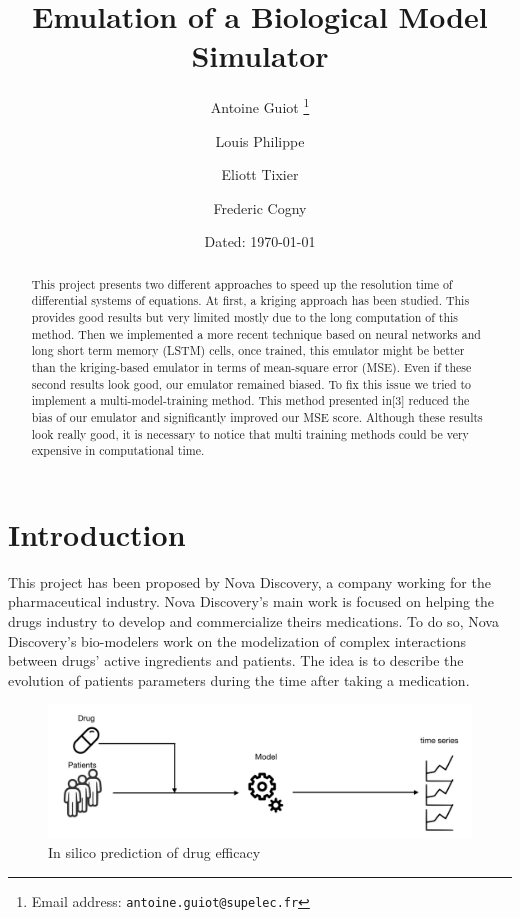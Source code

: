 \documentclass{article}
\title{Emulation of a Biological Model Simulator}
\date{Dated: \today}
\author[,1]{Antoine Guiot \thanks{Email address: \texttt{antoine.guiot@supelec.fr}}}
\author[2]{Louis Philippe }
\author[3]{Eliott Tixier}
\author[,4]{Frederic Cogny}
\affil[1]{CentraleSupélec}
\affil[2]{Nova Discovery}
\affil[3]{Nova Discovery}
\affil[4]{Nova Discovery}
\begin{document}
\maketitle

\begin{abstract}
    This project presents two different approaches to speed up the resolution time of differential systems of equations. At first, a kriging approach has been studied. This provides good results but very limited mostly due to the long computation of this method. Then we implemented a more recent technique based on neural networks and long short term memory (LSTM) cells, once trained, this emulator might be better than the kriging-based emulator in terms of mean-square error (MSE). Even if these second results look good, our emulator remained biased. To fix this issue we tried to implement a multi-model-training method. This method presented in[3] reduced the bias of our emulator and significantly improved our MSE score. Although these results look really good, it is necessary to notice that multi training methods could be very expensive in computational time.
\end{abstract}
\newpage
\tableofcontents
\newpage

\section{Introduction}

This project has been proposed by Nova Discovery, a company working for the pharmaceutical industry. Nova Discovery's main work is focused on helping the drugs industry to develop and commercialize theirs medications. To do so, Nova Discovery's bio-modelers work on the modelization of complex interactions between drugs' active ingredients and patients. The idea is to describe the evolution of patients parameters during the time after taking a medication. 

\begin{figure}[h!]
\centering
\includegraphics[scale=0.4]{image/introduction_fig.png}
\caption{In silico prediction of drug efficacy}
\label{fig:Drug efficacy prediction}
\end{figure}
\end{document}

